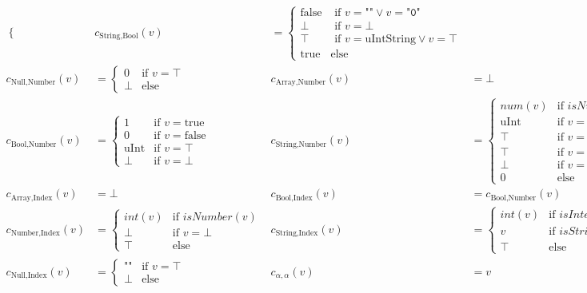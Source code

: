{\begin{align*}
\begin{cases}
  \end{cases} &
c_{\text{String}, \text{Bool}}(v) &= \begin{cases} 
       \text{false} & \text{ if $v = \texttt{""} \vee v = \texttt{"0"}$} \\
       \bot & \text{ if $v = \bot$}\\
       \top & \text{ if $v = \text{uIntString} \vee v = \top$}\\
       \text{true} & \text{else}
  \end{cases}\\
c_{\text{Null}, \text{Number}}(v) &= \begin{cases} 
       0 & \text{if $v = \top$}\\
       \bot & \text{else}
  \end{cases} &
  c_{\text{Array}, \text{Number}}(v) &= \bot \\
c_{\text{Bool}, \text{Number}}(v) &=\begin{cases} 
       1 & \text{if $v = $true}\\
       0 & \text{if $v = $false}\\
       \text{uInt} & \text{if $v = \top$}\\
       \bot & \text{if $v = \bot$}
  \end{cases} &
c_{\text{String}, \text{Number}}(v) &=\begin{cases} 
       \mathit{num}(v) & \text{if $\mathit{isNumber}(v)$}\\
       \text{uInt} & \text{if $v = $uIntString }\\
       \top & \text{if $v = $notUIntString  }\\
       \top & \text{if $v = \top$}\\
       \bot & \text{if $v = \bot$}\\
       0 & \text{else}
  \end{cases}\\
  c_{\text{Array}, \text{Index}}(v) &= \bot &
c_{\text{Bool}, \text{Index}}(v) &= c_{\text{Bool}, \text{Number}}(v)\\
c_{\text{Number}, \text{Index}}(v) &= \begin{cases} 
        \mathit{int}(v) & \text{if $\mathit{isNumber}(v)$}\\
        \bot & \text{if $v = \bot $}\\
        \top & \text{else} 
  \end{cases} &
c_{\text{String}, \text{Index}}(v) &= \begin{cases} 
       \mathit{int}(v) & \text{if $\mathit{isInteger}(v)$}\\
       v & \text{if $isString(v)$}\\
       \top & \text{else}
\end{cases}\\
c_{\text{Null}, \text{Index}}(v) &= \begin{cases} 
       \texttt{""} & \text{if $v = \top$}\\
       \bot & \text{else}
      \end{cases} &
c_{\alpha, \alpha} (v) &= v
\end{align*}
}
